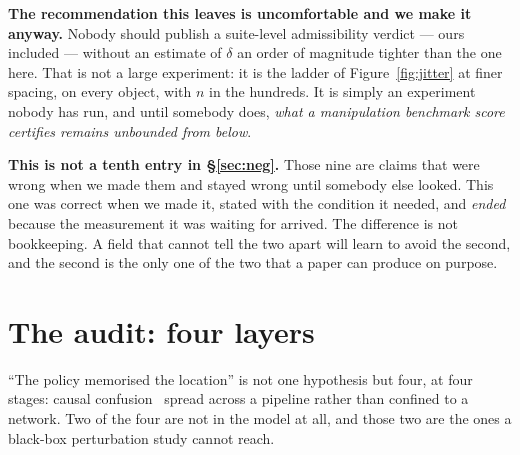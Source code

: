\documentclass[10pt,twocolumn]{article}
\begin{document}
\textbf{The recommendation this leaves is uncomfortable and we make it
anyway.} Nobody should publish a suite-level admissibility verdict --- ours
included --- without an estimate of $\delta$ an order of magnitude tighter than
the one here. That is not a large experiment: it is the ladder of
Figure~\ref{fig:jitter} at finer spacing, on every object, with $n$ in the
hundreds. It is simply an experiment nobody has run, and until somebody does,
\emph{what a manipulation benchmark score certifies remains unbounded from
below}.

\textbf{This is not a tenth entry in \S\ref{sec:neg}.} Those nine are claims
that were wrong when we made them and stayed wrong until somebody else looked.
This one was correct when we made it, stated with the condition it needed,
and \emph{ended} because the measurement it was waiting for arrived. The
difference is not bookkeeping. A field that cannot tell the two apart will
learn to avoid the second, and the second is the only one of the two that a
paper can produce on purpose.

\section{The audit: four layers}
\label{sec:audit}

``The policy memorised the location'' is not one hypothesis but four, at four
stages: causal confusion~\citep{dehaan2019causal} spread across a pipeline
rather than confined to a network. Two of the four are not in the model at all,
and those two are the ones a black-box perturbation study cannot reach.
\end{document}
